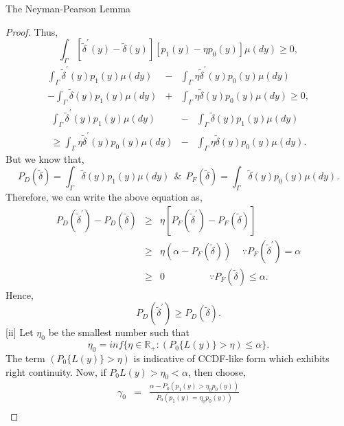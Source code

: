 \documentclass[a4paper,english,12pt]{article}
\begin{document}
\begin{lem}{The Neyman-Pearson Lemma}
\begin{proof}{}
Thus,
\begin{equation}
\int_{\Gamma} [\tilde{\delta}^{'} (y) - \tilde{\delta} (y) ][p_1(y) - \eta p_0(y)]  \mu (dy) \geq 0, 
\end{equation}
\begin{eqnarray}
\int_{\Gamma} \tilde{\delta}^{'} (y) p_1(y)  \mu (dy) &-& \int_{\Gamma} \eta \tilde{\delta}^{'} (y) p_0(y)  \mu (dy) \nonumber \\
- \int_{\Gamma} \tilde{\delta} (y) p_1(y)  \mu (dy) &+& \int_{\Gamma} \eta \tilde{\delta} (y) p_0(y)  \mu (dy) \geq 0,
\end{eqnarray}
\begin{eqnarray}
\int_{\Gamma} \tilde{\delta}^{'} (y) p_1(y)  \mu (dy) &-& \int_{\Gamma} \tilde{\delta} (y) p_1(y)  \mu (dy) \nonumber \\
\geq  \int_{\Gamma} \eta \tilde{\delta}^{'} (y) p_0(y)  \mu (dy)  &-& \int_{\Gamma} \eta \tilde{\delta} (y) p_0(y)  \mu (dy).
\end{eqnarray}
But we know that, 
\begin{equation}
P_D(\tilde{\delta}) = \int_{\Gamma} \tilde{\delta}(y) p_1(y) \mu (dy) ~~ \& ~~  P_F(\tilde{\delta}) = \int_{\Gamma} \tilde{\delta}(y) p_0(y) \mu (dy).
\end{equation}
Therefore, we can write the above equation as,
\begin{eqnarray}
\label{faineq}
P_D(\tilde{\delta}^{'}) - P_D(\tilde{\delta}) & \geq &  \eta [P_F(\tilde{\delta}^{'}) - P_F(\tilde{\delta})] \nonumber \\
& \geq & \eta (\alpha - P_F(\tilde{\delta})) ~~~~~ \because P_F(\tilde{\delta}^{'})  = \alpha \nonumber \\
& \geq & 0 ~~~~~~~~~~~~~~~~~~~~~ \because P_F(\tilde{\delta})  \leq \alpha.
\end{eqnarray}
Hence,
\begin{equation}
P_D(\tilde{\delta}^{'}) \geq P_D(\tilde{\delta}).
\end{equation}
[ii] Let $\eta_0$ be the smallest number such that 
\begin{equation}
\eta_0 = inf\{\eta \in \mathbb{R}_{+} : (P_0 \{L(y)\} > \eta) \leq \alpha\}.
\end{equation}
The term $(P_0 \{L(y)\} > \eta)$ is indicative of CCDF-like form which exhibits right continuity. Now, if $P_0{L(y) > \eta_0} < \alpha $, then choose,
\begin{eqnarray}
\gamma_0 &=& \frac{\alpha - P_0(p_1(y) > \eta_0 p_0(y))}{P_0(p_1(y) = \eta_0 p_0(y))} \nonumber \\

\end{eqnarray}
\end{proof}
\end{lem}
\end{document}
